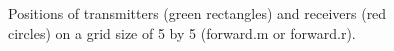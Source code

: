\documentclass[12pt,A4]{article}
\begin{document}
\begin{center}
\begin{figure}[h]
{\par}
\caption{Positions of transmitters (green rectangles) and receivers (red circles) on a grid size of 5 by 5 (forward.m or forward.r).}
\end{figure}
\end{center}
\end{document}
